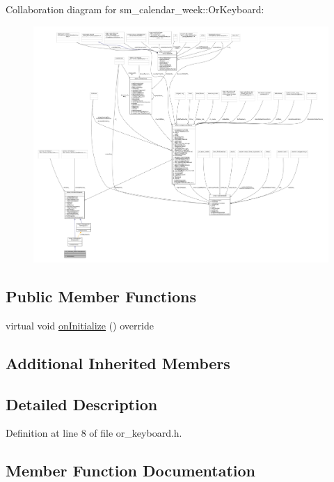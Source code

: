 Collaboration diagram for sm\+\_\+calendar\+\_\+week\+:\+:Or\+Keyboard\+:
\nopagebreak
\begin{figure}[H]
\begin{center}
\leavevmode
\includegraphics[width=350pt]{classsm__calendar__week_1_1OrKeyboard__coll__graph}
\end{center}
\end{figure}
\subsection*{Public Member Functions}
\begin{DoxyCompactItemize}
\item 
virtual void \hyperlink{classsm__calendar__week_1_1OrKeyboard_ab121ed865536455b8ac6fe784a50e7fc}{on\+Initialize} () override
\end{DoxyCompactItemize}
\subsection*{Additional Inherited Members}


\subsection{Detailed Description}


Definition at line 8 of file or\+\_\+keyboard.\+h.



\subsection{Member Function Documentation}
\mbox{\label{classsm__calendar__week_1_1OrKeyboard_ab121ed865536455b8ac6fe784a50e7fc}} 
